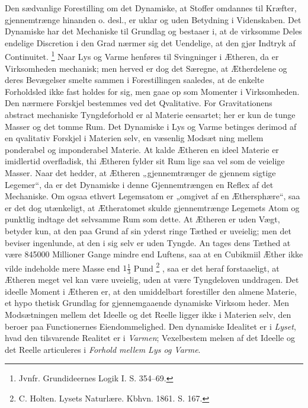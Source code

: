 \documentclass[12pt,a4paper]{book}
\renewcommand{\thefootnote}{*)}
\begin{document}
Den sædvanlige Forestilling om det Dynamiske, at Stoffer omdannes til
Kræfter, gjennemtrænge hinanden o. desl., er uklar og uden Betydning i
Videnskaben. Det Dynamiske har det Mechaniske til Grundlag og bestaaer i,
at de virksomme Deles endelige Discretion i den Grad nærmer sig det
Uendelige, at den gjør Indtryk af Continuitet.%
\footnote{%
Jvnfr. Grundideernes Logik I. S. 354--69.}
Naar Lys og Varme henføres til Svingninger i Ætheren, da er
Virksomheden mechanisk; men herved er dog det Særegne, at Ætherdelene
og deres Bevægelser smelte sammen i Forestillingen saaledes, at de
enkelte Forholdsled ikke fast\-%
holdes for sig, men gaae op som Momenter i Virksomheden. Den nærmere
Forskjel bestemmes ved det Qvalitative. For Gravitationens abstract
mechaniske Tyngdeforhold er al Materie eensartet; her er kun de tunge
Masser og det tomme Rum. Det Dynamiske i Lys og Varme betinges derimod
af en qvalitativ Forskjel i Materien selv, en væsenlig Modsæt\-%
ning mellem ponderabel og imponderabel Materie. At kalde Ætheren en
ideel Materie er imidlertid overfladisk, thi Ætheren fylder sit Rum
lige saa vel som de veielige Masser. Naar det hedder, at Ætheren
„gjennemtrænger de gjennem\-%
sigtige Legemer“, da er det Dynamiske i denne Gjennemtrængen en Reflex
af det Mechaniske. Om ogsaa ethvert Legemsatom er „omgivet af en
Æthersphære“, saa er det dog utænkeligt, at Ætheratomet skulde
gjennemtrænge Legemets Atom og punktlig indtage det selvsamme Rum som
dette. At Ætheren er uden Vægt, betyder kun, at den paa Grund af sin
yderst ringe Tæthed er uveielig; men det beviser ingenlunde, at den i
sig selv er uden Tyngde. An\-%
tages dens Tæthed at være 845000 Millioner Gange mindre end Luftens,
saa at en Cubikmiil Æther ikke vilde indeholde mere Masse end
$1\tfrac{1}{3}$ Pund%
\renewcommand{\thefootnote}{**)}%
\footnote{%
C. Holten. Lysets Naturlære. Kbhvn. 1861. S. 167.}%
\renewcommand{\thefootnote}{*)}%
, saa er det heraf forstaaeligt, at Ætheren meget vel kan være
uveielig, uden at være Tyngdeloven unddragen. Det ideelle Moment i
Ætheren er, at den umiddelbart forestiller den almene Materie, et
hypo\-%
thetisk Grundlag for gjennemgaaende dynamiske Virksom\-%
heder. Men Modsætningen mellem det Ideelle og det Reelle ligger ikke i
Materien selv, den beroer paa Functionernes Eiendommelighed. Den
dynamiske Idealitet er i \emph{Lyset}, hvad den tilsvarende Realitet er
i \emph{Varmen}; Vexelbestem\-%
melsen af det Ideelle og det Reelle articuleres i \emph{Forhold mellem
Lys og Varme}.
\end{document}
